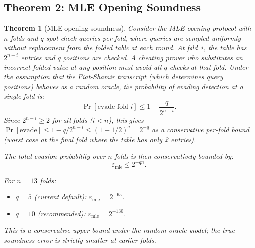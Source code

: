 \documentclass[10pt,twocolumn]{article}
\newtheorem{theorem}{Theorem}[section]
\theoremstyle{definition}
\theoremstyle{remark}
\begin{document}
\subsection{Theorem 2: MLE Opening Soundness}

\begin{theorem}[MLE opening soundness]\label{thm:mle}
  Consider the MLE opening protocol with $n$ folds and $q$
  spot-check queries per fold, where queries are sampled
  uniformly without replacement from the folded table at each
  round.
  At fold~$i$, the table has $2^{n-i}$ entries and $q$ positions
  are checked.
  A cheating prover who substitutes an incorrect folded value at
  any position must avoid all $q$ checks at that fold.
  Under the assumption that the Fiat-Shamir transcript
  (which determines query positions) behaves as a random oracle,
  the probability of evading detection at a single fold is:
  \[
    \Pr[\text{evade fold } i] \le 1 - \frac{q}{2^{n-i}}.
  \]
  Since $2^{n-i} \ge 2$ for all folds ($i < n$), this gives
  $\Pr[\text{evade}] \le 1 - q/2^{n-i} \le (1-1/2)^q = 2^{-q}$
  as a conservative per-fold bound (worst case at the final fold
  where the table has only 2 entries).

  The total evasion probability over $n$ folds is then
  conservatively bounded by:
  \begin{equation}\label{eq:mle-sound}
    \varepsilon_{\text{mle}} \le 2^{-qn}.
  \end{equation}

  For $n=13$ folds:
  \begin{itemize}[nosep,leftmargin=1.2em]
    \item $q=5$ (current default): $\varepsilon_{\text{mle}} = 2^{-65}$.
    \item $q=10$ (recommended): $\varepsilon_{\text{mle}} = 2^{-130}$.
  \end{itemize}
  This is a conservative upper bound under the random oracle
  model; the true soundness error is strictly smaller at
  earlier folds.
\end{theorem}
\end{document}
